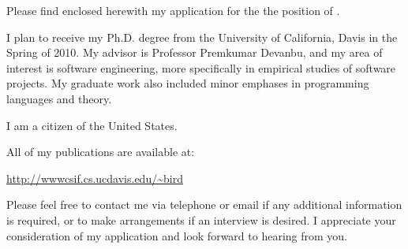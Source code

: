\documentclass[\@textsize]{newlfm}
\begin{document}

\begin{newlfm} 

Please find enclosed herewith my application for the the position of
\@jobposition 
\@joblocation.

I plan to receive my Ph.D. degree from the University of California, Davis in
the Spring of 2010.  My advisor is Professor Premkumar Devanbu, and my area of
interest is software engineering, more specifically in empirical studies of
software projects.  My graduate work also included minor emphases in 
programming languages and theory.

I am a citizen of the United States.

\@enclosedtext

All of my publications are available at:

{\small \url{http://wwwcsif.cs.ucdavis.edu/~bird}}

Please feel free to contact me via telephone or email if any additional
information is required, or to make arrangements if an interview is desired.
I appreciate your consideration of my application and look forward to hearing from
you.

\end{newlfm} 
\end{document}
